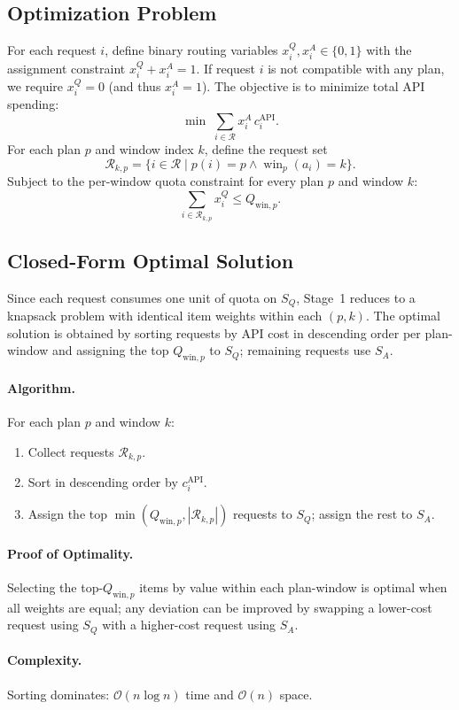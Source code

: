 \documentclass[11pt]{article}
\begin{document}
\subsection{Optimization Problem}
For each request \(i\), define binary routing variables \(x_i^Q, x_i^A \in \{0,1\}\) with the assignment constraint \(x_i^Q + x_i^A = 1\). If request \(i\) is not compatible with any plan, we require \(x_i^Q = 0\) (and thus \(x_i^A = 1\)). The objective is to minimize total API spending:
\[
  \min\; \sum_{i\in\mathcal{R}} x_i^A\,c_i^{\text{API}}.
\]
For each plan \(p\) and window index \(k\), define the request set
\[
  \mathcal{R}_{k,p} = \{ i \in \mathcal{R} \mid p(i)=p \land \operatorname{win}_p(a_i)=k \}.
\]
Subject to the per-window quota constraint for every plan \(p\) and window \(k\):
\[
  \sum_{i\in\mathcal{R}_{k,p}} x_i^Q \le Q_{\text{win},p}.
\]

\subsection{Closed-Form Optimal Solution}
Since each request consumes one unit of quota on \(S_Q\), Stage~1 reduces to a knapsack problem with identical item weights within each \((p,k)\). The optimal solution is obtained by sorting requests by API cost in descending order per plan-window and assigning the top \(Q_{\text{win},p}\) to \(S_Q\); remaining requests use \(S_A\).

\paragraph{Algorithm.}
For each plan \(p\) and window \(k\):
\begin{enumerate}
  \item Collect requests \(\mathcal{R}_{k,p}\).
  \item Sort in descending order by \(c_i^{\text{API}}\).
  \item Assign the top \(\min(Q_{\text{win},p}, |\mathcal{R}_{k,p}|)\) requests to \(S_Q\); assign the rest to \(S_A\).
\end{enumerate}
\paragraph{Proof of Optimality.}
Selecting the top-\(Q_{\text{win},p}\) items by value within each plan-window is optimal when all weights are equal; any deviation can be improved by swapping a lower-cost request using \(S_Q\) with a higher-cost request using \(S_A\).
\paragraph{Complexity.}
Sorting dominates: \(\mathcal{O}(n\log n)\) time and \(\mathcal{O}(n)\) space.
\end{document}
